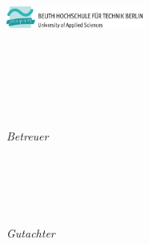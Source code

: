 \begin{titlepage}
	\vfill
	\begin{minipage}[t]{.35\textwidth}
		\raggedleft
		\includegraphics[width=4.5cm]{gfx/beuth} \\[2mm]
	\end{minipage}
	\hspace*{15pt}
	\begin{minipage}[t]{.59\textwidth}
		{\Large \thesisFirstReviewerUniversity} \\
	  	{\small \thesisFirstReviewerUniversityStreetAddress} \\[-1mm]
	  	{\small \thesisFirstReviewerUniversityPostalCode\ \thesisFirstReviewerUniversityCity} 
	\end{minipage} \\[15mm]
	\begin{minipage}[t]{.35\textwidth}
		\raggedleft
		\textit{Betreuer}
	\end{minipage}
	\hspace*{15pt}
	\begin{minipage}[t]{.59\textwidth}
		\textbf{\thesisFirstReviewer} \\
		{\small \thesisFirstPosition\\
		\thesisFirstReviewerUniversity}
		\vskip 0.2in
	\end{minipage} \\[15mm]
	\begin{minipage}[t]{.35\textwidth}
		\raggedleft
		\textit{Gutachter}
	\end{minipage}
	\hspace*{10pt}
	\begin{minipage}[t]{.59\textwidth}
		\textbf{\thesisSecondReviewer} \\
		{\small \thesisSecondPosition\\
		\thesisSecondReviewerUniversity}
	\end{minipage} \\
\end{titlepage}
